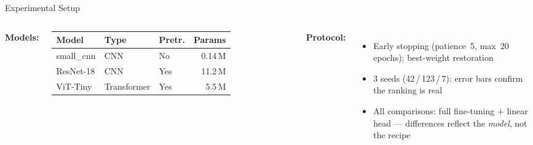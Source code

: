 \documentclass{beamer}
\begin{document}
\begin{frame}{Experimental Setup}

  \begin{columns}

      \textbf{Models:}

      \medskip
      \small
      \renewcommand{\arraystretch}{1.3}
      \begin{tabular}{@{}lllr@{}}
        \toprule
        Model      & Type        & Pretr. & Params \\
        \midrule
        small\_cnn & CNN         & No  & 0.14\,M \\
        ResNet-18  & CNN         & Yes & 11.2\,M \\
        ViT-Tiny   & Transformer & Yes & 5.5\,M \\
        \bottomrule
      \end{tabular}

      \small
      \textbf{Protocol:}
      \begin{itemize}
        \item Early stopping (patience~5, max~20 epochs); best-weight restoration
        \item 3 seeds (42\,/\,123\,/\,7): error bars confirm the ranking is real
        \item All comparisons: full fine-tuning + linear head --- differences reflect the \emph{model}, not the recipe
      \end{itemize}

  \end{columns}


\end{frame}
\end{document}
